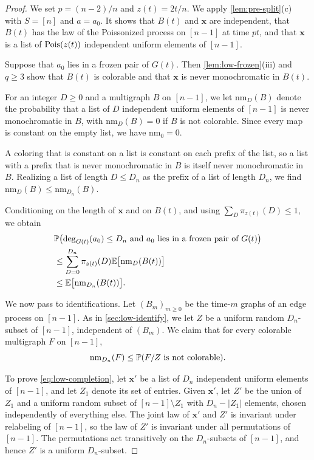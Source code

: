 \begin{proof}
We set $p = (n - 2)/n$ and $z(t) = 2t/n$. We apply \cref{lem:pre-split}(c) with $S = [n]$ and $a = a_0$. It shows that $B(t)$ and $\mathbf x$ are independent, that $B(t)$ has the law of the Poissonized process on $[n - 1]$ at time $pt$, and that $\mathbf x$ is a list of $\operatorname{Pois}(z(t))$ independent uniform elements of $[n - 1]$.

Suppose that $a_0$ lies in a frozen pair of $G(t)$. Then \cref{lem:low-frozen}(iii) and $q \ge 3$ show that $B(t)$ is colorable and that $\mathbf x$ is never monochromatic in $B(t)$.

For an integer $D \ge 0$ and a multigraph $B$ on $[n - 1]$, we let $\mathrm{nm}_D(B)$ denote the probability that a list of $D$ independent uniform elements of $[n - 1]$ is never monochromatic in $B$, with $\mathrm{nm}_D(B) = 0$ if $B$ is not colorable. Since every map is constant on the empty list, we have $\mathrm{nm}_0 = 0$.

A coloring that is constant on a list is constant on each prefix of the list, so a list with a prefix that is never monochromatic in $B$ is itself never monochromatic in $B$. Realizing a list of length $D \le D_n$ as the prefix of a list of length $D_n$, we find $\mathrm{nm}_D(B) \le \mathrm{nm}_{D_n}(B)$.

Conditioning on the length of $\mathbf x$ and on $B(t)$, and using $\sum_{D} \pi_{z(t)}(D) \le 1$, we obtain
\begin{equation}\label{eq:low-nm}
\begin{aligned}
&\mathbb P\bigl(\deg_{G(t)}(a_0) \le D_n \text{ and } a_0 \text{ lies in a frozen pair of } G(t)\bigr) \\
&\le \sum_{D = 0}^{D_n} \pi_{z(t)}(D) \mathbb E\bigl[\mathrm{nm}_D(B(t))\bigr] \\
&\le \mathbb E\bigl[\mathrm{nm}_{D_n}(B(t))\bigr].
\end{aligned}
\end{equation}

We now pass to identifications. Let $(B_m)_{m \ge 0}$ be the time-$m$ graphs of an edge process on $[n - 1]$. As in \cref{sec:low-identify}, we let $Z$ be a uniform random $D_n$-subset of $[n - 1]$, independent of $(B_m)$. We claim that for every colorable multigraph $F$ on $[n - 1]$,
\begin{equation}\label{eq:low-completion}
\mathrm{nm}_{D_n}(F) \le \mathbb P(F/Z \text{ is not colorable}).
\end{equation}

To prove \eqref{eq:low-completion}, let $\mathbf x'$ be a list of $D_n$ independent uniform elements of $[n - 1]$, and let $Z_1$ denote its set of entries. Given $\mathbf x'$, let $Z'$ be the union of $Z_1$ and a uniform random subset of $[n - 1] \setminus Z_1$ with $D_n - |Z_1|$ elements, chosen independently of everything else. The joint law of $\mathbf x'$ and $Z'$ is invariant under relabeling of $[n - 1]$, so the law of $Z'$ is invariant under all permutations of $[n - 1]$. The permutations act transitively on the $D_n$-subsets of $[n - 1]$, and hence $Z'$ is a uniform $D_n$-subset.


\end{proof}
